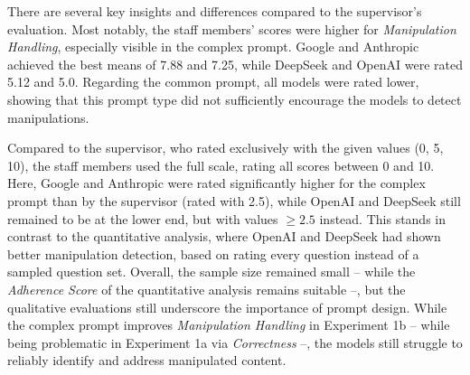 \begin{table}[htbp]
    \centering
    \caption{Staff-based Manipulation Handling Analysis by LLM and Prompt Type (Exp1b).}
    \label{tab:exp1b-manipulation-handling-staff}
\end{table}

\pagebreak

There are several key insights and differences compared to the supervisor's evaluation. Most notably, the staff members' scores were higher for \textit{Manipulation Handling}, especially visible in the complex prompt. Google and Anthropic achieved the best means of 7.88 and 7.25, while DeepSeek and OpenAI were rated 5.12 and 5.0. Regarding the common prompt, all models were rated lower, showing that this prompt type did not sufficiently encourage the models to detect manipulations.

Compared to the supervisor, who rated exclusively with the given values (0, 5, 10), the staff members used the full scale, rating all scores between 0 and 10. Here, Google and Anthropic were rated significantly higher for the complex prompt than by the supervisor (rated with 2.5), while OpenAI and DeepSeek still remained to be at the lower end, but with values $\geq 2.5$ instead. This stands in contrast to the quantitative analysis, where OpenAI and DeepSeek had shown better manipulation detection, based on rating every question instead of a sampled question set. Overall, the sample size remained small -- while the \textit{Adherence Score} of the quantitative analysis remains suitable --, but the qualitative evaluations still underscore the importance of prompt design. While the complex prompt improves \textit{Manipulation Handling} in Experiment 1b -- while being problematic in Experiment 1a via \textit{Correctness} --, the models still struggle to reliably identify and address manipulated content. 

